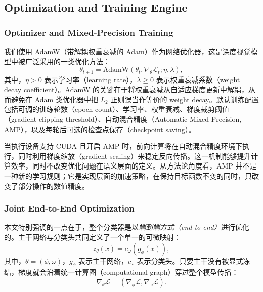 \subsection{Optimization and Training Engine}
\label{subsec:optimization_training}

\subsubsection{Optimizer and Mixed-Precision Training}

我们使用 AdamW（带解耦权重衰减的 Adam）作为网络优化器，这是深度视觉模型中被广泛采用的一类优化方法：
\begin{equation}
    \theta_{t+1} = \mathrm{AdamW}(\theta_{t}, \nabla_{\theta} \mathcal{L}_{t}; \eta, \lambda),
\end{equation}
其中，$\eta > 0$ 表示学习率（learning rate），$\lambda \ge 0$ 表示权重衰减系数（weight decay coefficient）。AdamW 的关键在于将权重衰减从自适应梯度更新中解耦，从而避免在 Adam 类优化器中把 $L_{2}$ 正则误当作等价的 weight decay\cite{Loshchilov2019AdamW}。默认训练配置包括可调的训练轮数（epoch count）、学习率、权重衰减、梯度裁剪阈值（gradient clipping threshold）、自动混合精度（Automatic Mixed Precision, AMP），以及每轮后可选的检查点保存（checkpoint saving）。

当执行设备支持 CUDA 且开启 AMP 时，前向计算将在自动混合精度环境下执行，同时利用梯度缩放（gradient scaling）来稳定反向传播。这一机制能够提升计算效率，同时不改变优化问题在语义层面的定义。从方法论角度看，AMP 并不是一种新的学习规则；它是实现层面的加速策略，在保持目标函数不变的同时，只改变了部分操作的数值精度\cite{Micikevicius2018MixedPrecision}。

\subsubsection{Joint End-to-End Optimization}

本文特别强调的一点在于，整个分类器是以\emph{端到端方式（end-to-end）}进行优化的。主干网络与分类头共同定义了一个单一的可微映射：
\begin{equation}
    z_{\theta}(x) = c_{\omega}(g_{\phi}(x)),
\end{equation}
其中，$\theta = (\phi, \omega)$，$g_{\phi}$ 表示主干网络，$c_{\omega}$ 表示分类头。只要主干没有被显式冻结，梯度就会沿着统一计算图（computational graph）穿过整个模型传播：
\begin{equation}
    \nabla_{\theta} \mathcal{L} = \left( \nabla_{\phi} \mathcal{L}, \nabla_{\omega} \mathcal{L} \right).
\end{equation}

